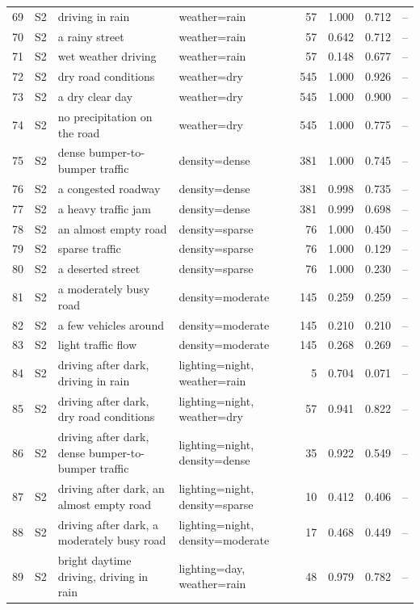 \begin{longtable}{r l p{5.0cm} p{3.4cm} r r r r}
69 & S2 & driving in rain & weather=rain & 57 & 1.000 & 0.712 & --\\
70 & S2 & a rainy street & weather=rain & 57 & 0.642 & 0.712 & --\\
71 & S2 & wet weather driving & weather=rain & 57 & 0.148 & 0.677 & --\\
72 & S2 & dry road conditions & weather=dry & 545 & 1.000 & 0.926 & --\\
73 & S2 & a dry clear day & weather=dry & 545 & 1.000 & 0.900 & --\\
74 & S2 & no precipitation on the road & weather=dry & 545 & 1.000 & 0.775 & --\\
75 & S2 & dense bumper-to-bumper traffic & density=dense & 381 & 1.000 & 0.745 & --\\
76 & S2 & a congested roadway & density=dense & 381 & 0.998 & 0.735 & --\\
77 & S2 & a heavy traffic jam & density=dense & 381 & 0.999 & 0.698 & --\\
78 & S2 & an almost empty road & density=sparse & 76 & 1.000 & 0.450 & --\\
79 & S2 & sparse traffic & density=sparse & 76 & 1.000 & 0.129 & --\\
80 & S2 & a deserted street & density=sparse & 76 & 1.000 & 0.230 & --\\
81 & S2 & a moderately busy road & density=moderate & 145 & 0.259 & 0.259 & --\\
82 & S2 & a few vehicles around & density=moderate & 145 & 0.210 & 0.210 & --\\
83 & S2 & light traffic flow & density=moderate & 145 & 0.268 & 0.269 & --\\
84 & S2 & driving after dark, driving in rain & lighting=night, weather=rain & 5 & 0.704 & 0.071 & --\\
85 & S2 & driving after dark, dry road conditions & lighting=night, weather=dry & 57 & 0.941 & 0.822 & --\\
86 & S2 & driving after dark, dense bumper-to-bumper traffic & lighting=night, density=dense & 35 & 0.922 & 0.549 & --\\
87 & S2 & driving after dark, an almost empty road & lighting=night, density=sparse & 10 & 0.412 & 0.406 & --\\
88 & S2 & driving after dark, a moderately busy road & lighting=night, density=moderate & 17 & 0.468 & 0.449 & --\\
89 & S2 & bright daytime driving, driving in rain & lighting=day, weather=rain & 48 & 0.979 & 0.782 & --\\

\end{longtable}
